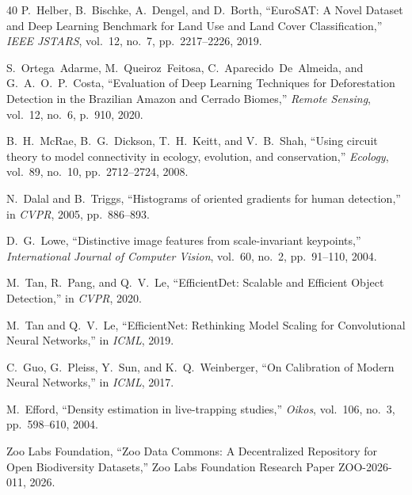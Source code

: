 \documentclass[11pt,letterpaper]{article}
\begin{document}
\begin{thebibliography}{40}
P.~Helber, B.~Bischke, A.~Dengel, and D.~Borth, ``EuroSAT: A Novel Dataset and Deep Learning Benchmark for Land Use and Land Cover Classification,'' \emph{IEEE JSTARS}, vol.~12, no.~7, pp.~2217--2226, 2019.

S.~Ortega~Adarme, M.~Queiroz~Feitosa, C.~Aparecido~De~Almeida, and G.~A.~O.~P.~Costa, ``Evaluation of Deep Learning Techniques for Deforestation Detection in the Brazilian Amazon and Cerrado Biomes,'' \emph{Remote Sensing}, vol.~12, no.~6, p.~910, 2020.

B.~H.~McRae, B.~G.~Dickson, T.~H.~Keitt, and V.~B.~Shah, ``Using circuit theory to model connectivity in ecology, evolution, and conservation,'' \emph{Ecology}, vol.~89, no.~10, pp.~2712--2724, 2008.

N.~Dalal and B.~Triggs, ``Histograms of oriented gradients for human detection,'' in \emph{CVPR}, 2005, pp.~886--893.

D.~G.~Lowe, ``Distinctive image features from scale-invariant keypoints,'' \emph{International Journal of Computer Vision}, vol.~60, no.~2, pp.~91--110, 2004.

M.~Tan, R.~Pang, and Q.~V.~Le, ``EfficientDet: Scalable and Efficient Object Detection,'' in \emph{CVPR}, 2020.

M.~Tan and Q.~V.~Le, ``EfficientNet: Rethinking Model Scaling for Convolutional Neural Networks,'' in \emph{ICML}, 2019.

C.~Guo, G.~Pleiss, Y.~Sun, and K.~Q.~Weinberger, ``On Calibration of Modern Neural Networks,'' in \emph{ICML}, 2017.

M.~Efford, ``Density estimation in live-trapping studies,'' \emph{Oikos}, vol.~106, no.~3, pp.~598--610, 2004.

Zoo Labs Foundation, ``Zoo Data Commons: A Decentralized Repository for Open Biodiversity Datasets,'' Zoo Labs Foundation Research Paper ZOO-2026-011, 2026.

\end{thebibliography}
\end{document}
